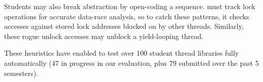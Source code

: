 Students may also break abstraction by open-coding a  sequence.
\landslide must track lock operations for accurate data-race analysis,
so to catch these patterns, it
checks accesses against stored lock addresses blocked on by other threads.
Similarly, these rogue unlock accesses may unblock a yield-looping thread.

These heuristics have enabled \landslide to test over 100 student thread libraries
fully automatically
(47 in progress in our evaluation, plus
79 submitted over the past 5 semesters).
